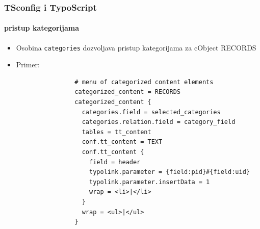 
\begin{frame}[fragile]
	\frametitle{TSconfig i TypoScript}
	\framesubtitle{pristup kategorijama}

	\begin{itemize}
		\item Osobina \texttt{categories} dozvoljava pristup kategorijama\newline
			za cObject RECORDS

		\item Primer:

			\lstset{
				basicstyle=\tiny\ttfamily
			}

			\begin{lstlisting}
				# menu of categorized content elements
				categorized_content = RECORDS
				categorized_content {
				  categories.field = selected_categories
				  categories.relation.field = category_field
				  tables = tt_content
				  conf.tt_content = TEXT
				  conf.tt_content {
				    field = header
				    typolink.parameter = {field:pid}#{field:uid}
				    typolink.parameter.insertData = 1
				    wrap = <li>|</li>
				  }
				  wrap = <ul>|</ul>
				}
			\end{lstlisting}

	\end{itemize}

\end{frame}


